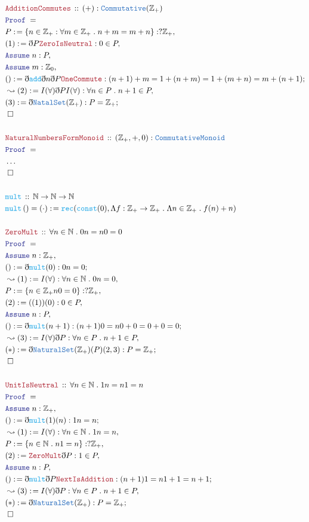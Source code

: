 \documentclass[12pt]{scrartcl}
\newcommand{\TYPE}[1]{\textcolor{NavyBlue}{\mathtt{#1}}}
\newcommand{\FUNC}[1]{\textcolor{Cerulean}{\mathtt{#1}}}
\newcommand{\LOGIC}[1]{\textcolor{Blue}{\mathtt{#1}}}
\newcommand{\THM}[1]{\textcolor{Maroon}{\mathtt{#1}}}
\renewcommand{\.}{\; . \;}
\newcommand{\de}{: \kern 0.1pc =}
\newcommand{\Act}[1]{\left( #1 \right)}
\newcommand{\Theorem}[2]{& \THM{#1} \, :: \, #2 \\ & \Proof = \\ }
\newcommand{\DeclareFunc}[2]{& \FUNC{#1} \, :: \, #2 \\}
\newcommand{\DefineNamedFunc}[4]{&  \FUNC{#1}\Act{#2} = #3 \de #4 \\}
\newcommand{\Page}[1]{ \begin{align*} #1 \end{align*}   }
\newcommand{ \bd }{ \ByDef }
\newcommand{\NoProof}{ & \ldots \\ \EndProof}
\newcommand{\Int}{\mathbb{Z} }
\newcommand{\Nat}{\mathbb{N} }
\newcommand{\Say}[3]{& #1 \de #2 : #3, \\}
\newcommand{\Conclude}[3]{& #1 \de #2 : #3; \\}
\newcommand{\Derive}[3]{& \leadsto #1 \de #2 : #3, \\}
\newcommand{\Assume}[2]{& \LOGIC{Assume} \; #1 : #2, \\}
\newcommand{\QED}{\; \square}
\newcommand{\EndProof}{& \QED \\}
\newcommand{\ByDef}{\eth}
\newcommand{\Proof}{\LOGIC{Proof} \; }
\begin{document}
\Page{
	\Theorem{AdditionCommutes}{(+) : \TYPE{Commutative}(\Int_+)}
	\Say{P}{ \{ n \in \Int_+ : \forall m \in \Int_+ \. n + m = m + n \}   }{?\Int_+}
	\Say{(1)}{\bd P \THM{ZeroIsNeutral}}{0 \in P}
	\Assume{n}{P}
	\Assume{m}{\Int_0}
	\Conclude{()}{\bd \FUNC{add} \bd n \bd P \THM{OneCommute} }{(n +1) + m = 1 + (n + m ) = 1 + (m + n) =  m + (n + 1)}
	\Derive{(2)}{I(\forall)\bd P I(\forall)}{\forall n \in P \. n + 1 \in P}
	\Conclude{(3)}{\bd \TYPE{NatalSet}(\Int_+)}{P = \Int_+}
	\EndProof
	\\
	\Theorem{NaturalNumbersFormMonoid}{ (\Int_+,+,0) : \TYPE{CommutativeMonoid}}
	\NoProof	
	\\
	\DeclareFunc{mult}{\Nat \to \Nat \to \Nat}
	\DefineNamedFunc{mult}{}{(\cdot)}{\FUNC{rec}(\FUNC{const}(0),\Lambda f : \Int_+ \to \Int_+ \. \Lambda n \in \Int_+ \. f(n) + n)}
	\\
	\Theorem{ZeroMult}{\forall n \in \Nat \. 0n = n0 = 0}
	\Assume{n}{\Int_+}
	\Conclude{()}{\bd \FUNC{mult}(0)}{0n = 0}
	\Derive{(1)}{I(\forall) }{\forall n \in \Nat \. 0n = 0}
	\Say{P}{\{ n \in \Int_+ n0 = 0  \}}{?\Int_+}
	\Say{(2)}{((1))(0)}{0 \in P}
	\Assume{n }{P}
	\Conclude{()}{\bd \FUNC{mult}(n + 1)}{(n + 1)0 = n0 + 0 = 0 + 0 = 0}
	\Derive{(3)}{I(\forall)\bd P}{ \forall n \in P \. n + 1 \in P}
	\Conclude{(*)}{\bd \TYPE{NaturalSet}(\Int_+)(P)(2,3)}{P = \Int_+}
	\EndProof
	\\
	\Theorem{UnitIsNeutral}{\forall n \in \Nat \. 1n = n1 = n}
	\Assume{n}{\Int_+}
	\Conclude{()}{\bd \FUNC{mult}(1)(n)}{1n = n}
	\Derive{(1)}{I(\forall)}{\forall n \in \Nat \. 1n =n}
	\Say{P}{\{ n \in \Nat \. n1 = n \}}{?\Int_+}
	\Say{(2)}{\THM{ZeroMult}\bd P}{1 \in P}
	\Assume{n}{P}
	\Conclude{()}{ \bd \FUNC{mult} \bd P \THM{NextIsAddition}   }{ (n +1)1 = n1 + 1 = n + 1 }
	\Derive{(3)}{I(\forall) \bd P}{\forall n \in P \. n + 1 \in P} 
	\Conclude{(*)}{\bd \TYPE{NaturalSet}(\Int_+)}{P = \Int_+}
	\EndProof
}
\end{document}
